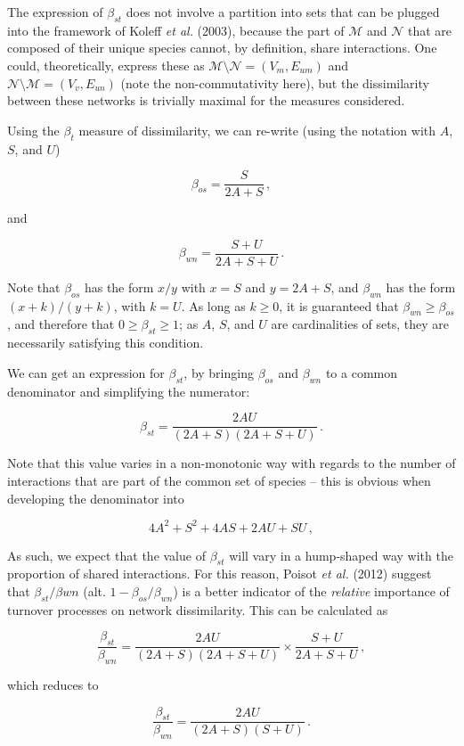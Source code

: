 \documentclass[10pt,oneside]{article}
\begin{document}
The expression of \(\beta_{st}\) does not involve a partition into sets
that can be plugged into the framework of Koleff \emph{et al.} (2003),
because the part of \(\mathcal{M}\) and \(\mathcal{N}\) that are
composed of their unique species cannot, by definition, share
interactions. One could, theoretically, express these as
\(\mathcal{M} \setminus \mathcal{N} = (V_m, E_{um})\) and
\(\mathcal{N} \setminus \mathcal{M} = (V_v, E_{un})\) (note the
non-commutativity here), but the dissimilarity between these networks is
trivially maximal for the measures considered.

Using the \(\beta_t\) measure of dissimilarity, we can re-write (using
the notation with \(A\), \(S\), and \(U\))

\[\beta_{os} = \frac{S}{2A+S}\,,\]

and

\[\beta_{wn} = \frac{S+U}{2A+S+U}\,.\]

Note that \(\beta_{os}\) has the form \(x/y\) with \(x = S\) and
\(y = 2A+S\), and \(\beta_{wn}\) has the form \((x+k)/(y+k)\), with
\(k = U\). As long as \(k \ge 0\), it is guaranteed that
\(\beta_{wn} \ge \beta_{os}\), and therefore that
\(0 \ge \beta_{st} \ge 1\); as \(A\), \(S\), and \(U\) are cardinalities
of sets, they are necessarily satisfying this condition.

We can get an expression for \(\beta_{st}\), by bringing \(\beta_{os}\)
and \(\beta_{wn}\) to a common denominator and simplifying the
numerator:

\[\beta_{st} = \frac{2AU}{(2A+S)(2A+S+U)}\,.\]

Note that this value varies in a non-monotonic way with regards to the
number of interactions that are part of the common set of species --
this is obvious when developing the denominator into

\[4A^2 + S^2 + 4AS + 2AU + SU\,,\]

As such, we expect that the value of \(\beta_{st}\) will vary in a
hump-shaped way with the proportion of shared interactions. For this
reason, Poisot \emph{et al.} (2012) suggest that
\(\beta_{st}/\beta{wn}\) (alt. \(1-\beta_{os}/\beta_{wn}\)) is a better
indicator of the \emph{relative} importance of turnover processes on
network dissimilarity. This can be calculated as

\[\frac{\beta_{st}}{\beta_{wn}} = \frac{2AU}{(2A+S)(2A+S+U)}\times\frac{S+U}{2A+S+U}\,,\]

which reduces to

\[\frac{\beta_{st}}{\beta_{wn}} = \frac{2AU}{(2A+S)(S+U)}\,.\]
\end{document}

